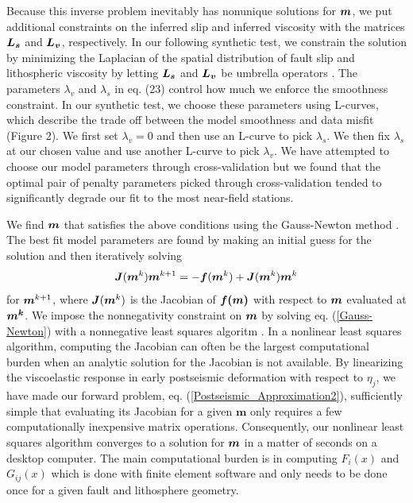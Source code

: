 \documentclass[extra,mreferee]{gji}
\begin{document}
Because this inverse problem inevitably has nonunique solutions for
$\mitbf{m}$, we put additional constraints on the inferred slip and
inferred viscosity with the matrices $\mitbf{L_s}$ and $\mitbf{L_v}$,
respectively.  In our following synthetic test, we constrain the
solution by minimizing the Laplacian of the spatial distribution of
fault slip and lithospheric viscosity by letting
$\mitbf{L_s}$ and $\mitbf{L_v}$ be umbrella operators \citep{D1999}.
The parameters $\lambda_v$ and $\lambda_s$ in eq. (23) control how
much we enforce the smoothness constraint.  In our synthetic test, we
choose these parameters using L-curves, which describe the trade off
between the model smoothness and data misfit (Figure 2).  We first set
$\lambda_v=0$ and then use an L-curve to pick $\lambda_s$.  We then
fix $\lambda_s$ at our chosen value and use another L-curve to pick
$\lambda_v$.  We have attempted to choose our model parameters through
cross-validation but we found that the optimal pair of penalty
parameters picked through cross-validation tended to significantly
degrade our fit to the most near-field stations.

We find $\mitbf{m}$ that satisfies the above conditions using the
Gauss-Newton method \citep[e.g.][]{A2013}.  The best fit model parameters are
found by making an initial guess for the solution and then iteratively
solving
\begin{equation}\label{Gauss-Newton}
\mitbf{J}(\mitbf{m}^{k})\mitbf{m}^{k+1} = -\mitbf{f}(\mitbf{m}^k) + \mitbf{J}(\mitbf{m}^{k})\mitbf{m}^{k}
\end{equation}
for $\mitbf{m}^{k+1}$, where $\mitbf{J}(\mitbf{m}^k)$ is the Jacobian
of $\mitbf{f(m)}$ with respect to $\mitbf{m}$ evaluated at
$\mitbf{m^k}$. We impose the nonnegativity constraint on $\mitbf{m}$
by solving eq. (\ref{Gauss-Newton}) with a nonnegative least squares
algoritm \citep{LH1974}. In a nonlinear least squares algorithm,
computing the Jacobian can often be the largest computational burden
when an analytic solution for the Jacobian is not available. By
linearizing the viscoelastic response in early postseismic deformation
with respect to $\eta_j$, we have made our forward problem,
eq. (\ref{Postseismic_Approximation2}), sufficiently simple that
evaluating its Jacobian for a given $\mathbf{m}$ only requires a few
computationally inexpensive matrix operations. Consequently, our
nonlinear least squares algorithm converges to a solution for
$\mitbf{m}$ in a matter of seconds on a desktop computer.  The main
computational burden is in computing $F_i(x)$ and $G_{ij}(x)$ which is
done with finite element software and only needs to be done once for a
given fault and lithosphere geometry.
\end{document}
